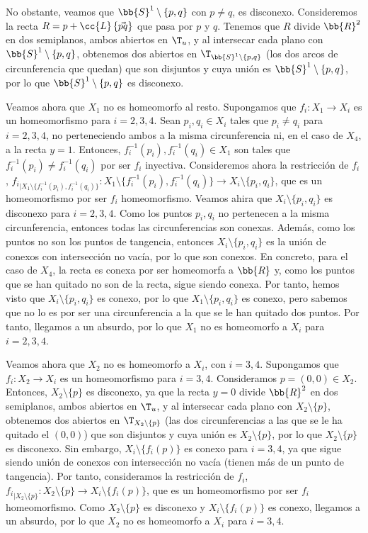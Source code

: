 \begin{ejercicio}
    No obstante, veamos que $\bb{S}^1\setminus \{p,q\}$ con $p\neq q$, es disconexo. Consideremos la recta $R=p+\cc{L}\left\{\vec{pq}\right\}$ que
    pasa por $p$ y $q$. Tenemos que $R$ divide $\bb{R}^2$ en dos semiplanos, ambos abiertos en $\T_u$, y al intersecar cada plano con $\bb{S}^1\setminus \{p,q\}$,
    obtenemos dos abiertos en $\T_{\bb{S}^1\setminus \{p,q\}}$ (los dos arcos de circunferencia que quedan) que son disjuntos y cuya unión es $\bb{S}^1\setminus \{p,q\}$,
    por lo que $\bb{S}^1\setminus \{p,q\}$ es disconexo.

    Veamos ahora que $X_1$ no es homeomorfo al resto. Supongamos que $f_i:X_1\to X_i$ es un homeomorfismo para $i=2,3,4$.
    Sean $p_i,q_i\in X_i$ tales que $p_i\neq q_i$ para $i=2,3,4$, no perteneciendo ambos a la misma circunferencia ni, en el caso de $X_4$, a la recta $y=1$.
    Entonces, $f_i^{-1}(p_i),f_i^{-1}(q_i)\in X_1$ son tales que $f_i^{-1}(p_i)\neq f_i^{-1}(q_i)$ por ser $f_i$ inyectiva.
    Consideremos ahora la restricción de $f_i$, ${f_i}_{\big| X_1\setminus \{f_i^{-1}(p_i), f_i^{-1}(q_i)\}}: X_1\setminus \{f_i^{-1}(p_i), f_i^{-1}(q_i)\} \to X_i\setminus \{p_i,q_i\}$,
    que es un homeomorfismo por ser $f_i$ homeomorfismo. Veamos ahira que $X_i\setminus \{p_i,q_i\}$ es disconexo para $i=2,3,4$.
    Como los puntos $p_i,q_i$ no pertenecen a la misma circunferencia, entonces todas las circunferencias son conexas. Además, como
    los puntos no son los puntos de tangencia, entonces $X_i\setminus \{p_i,q_i\}$ es la unión de conexos con intersección no vacía, por lo que son conexos.
    En concreto, para el caso de $X_4$, la recta es conexa por ser homeomorfa a $\bb{R}$ y, como los puntos que se han quitado no son de la recta, sigue siendo conexa.
    Por tanto, hemos visto que $X_i\setminus \{p_i,q_i\}$ es conexo, por lo que $X_1\setminus \{p_i,q_i\}$ es conexo, pero sabemos que no lo es por ser una circunferencia a la que se le han quitado dos puntos.
    Por tanto, llegamos a un absurdo, por lo que $X_1$ no es homeomorfo a $X_i$ para $i=2,3,4$.

    Veamos ahora que $X_2$ no es homeomorfo a $X_i$, con $i=3,4$. Supongamos que $f_i:X_2\to X_i$ es un homeomorfismo para $i=3,4$.
    Consideramos $p=(0,0)\in X_2$. Entonces, $X_2\setminus \{p\}$ es disconexo, ya que la recta $y=0$ divide $\bb{R}^2$ en dos semiplanos, ambos abiertos en $\T_u$,
    y al intersecar cada plano con $X_2\setminus \{p\}$, obtenemos dos abiertos en $\T_{X_2\setminus \{p\}}$ (las dos circunferencias a las que se le ha quitado el $(0,0)$)
    que son disjuntos y cuya unión es $X_2\setminus \{p\}$, por lo que $X_2\setminus \{p\}$ es disconexo. Sin embargo, $X_i\setminus \{f_i(p)\}$ es conexo para $i=3,4$,
    ya que sigue siendo unión de conexos con intersección no vacía (tienen más de un punto de tangencia).
    Por tanto, consideramos la restricción de $f_i$, ${f_i}_{\big| X_2\setminus \{p\}}: X_2\setminus \{p\} \to X_i\setminus \{f_i(p)\}$, que es un homeomorfismo por ser $f_i$ homeomorfismo.
    Como $X_2\setminus \{p\}$ es disconexo y $X_i\setminus \{f_i(p)\}$ es conexo, llegamos a un absurdo, por lo que $X_2$ no es homeomorfo a $X_i$ para $i=3,4$.


\end{ejercicio}

